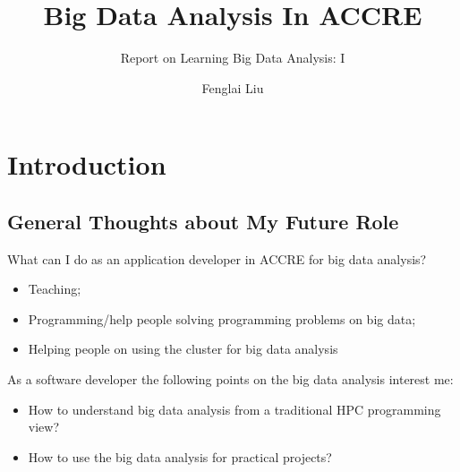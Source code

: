 \documentclass[notheorems, aspectratio=54]{beamer}
\title[Big Data Analysis In ACCRE]{Big Data Analysis In ACCRE}
\subtitle{Report on Learning Big Data Analysis: I}
\author{Fenglai Liu}
\institute[ACCRE]{fenglai@accre.vanderbilt.edu}
\begin{document}
\begin{frame}
    \titlepage
\end{frame}

\section{Introduction}
\subsection{General Thoughts about My Future Role}
\begin{frame}

\begin{block}{What can I do as an application developer in ACCRE for big data analysis?}
\begin{itemize}
 \item Teaching;
 \item Programming/help people solving programming problems on big data;
 \item Helping people on using the cluster for big data analysis
\end{itemize}
\end{block}

 As a software developer the following points on the big data analysis interest me:
\begin{itemize}
 \item How to understand big data analysis from a traditional HPC programming view?
 \item How to use the big data analysis for practical projects?
\end{itemize}

\end{frame}

\end{document}
